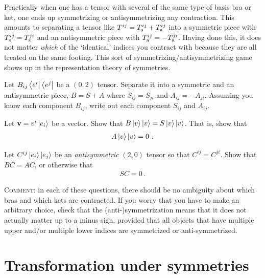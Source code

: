 \documentclass[12pt, oneside]{report}    %
\let\oldsection\section
\def\section{%
  \setcounter{sidenote}{1}%
  \oldsection
}
\begin{document}
Practically when one has a tensor with several of the same type of basis bra or ket, one ends up symmetrizing or antisymmetrizing any contraction. This amounts to separating a tensor like $T^{ij} = T^{ij}_\textnormal{s} + T^{ij}_\textnormal{a}$ into a symmetric piece with $T_\textnormal{s}^{ij} = T_\textnormal{s}^{ji}$ and an antisymmetric piece with $T_\textnormal{a}^{ij}=-T_\textnormal{a}^{ji}$. Having done this, it does not matter \emph{which} of the `identical' indices you contract with because they are all treated on the same footing. This sort of symmetrizing/antisymmetrizing game shows up in the representation theory of symmetries.

\begin{exercise}
Let $B_{ij}\left\langle e^i\right|\left\langle e^j\right|$ be a $(0,2)$ tensor. Separate it into a symmetric and an antisymmetric piece, $B = S+A$ where $S_{ij} = S_{ji}$ and $A_{ij} = - A_{ji}$. Assuming you know each component $B_{ij}$, write out each component $S_{ij}$ and $A_{ij}$.

Let $\mathbf{v} = v^i\left|e_i\right\rangle$ be a vector. Show that $B\left|v\right\rangle\left|v\right\rangle = S\left|v\right\rangle\left|v\right\rangle$. That is, show that
\begin{align}
    A\left|v\right\rangle\left|v\right\rangle = 0 \ .
\end{align}

Let $C^{ij}\left|e_i\right\rangle\left|e_j\right\rangle$ be an \emph{antisymmetric} $(2,0)$ tensor so that $C^{ij} = C^{ji}$. Show that $BC = AC$, or otherwise that
\begin{align}
    SC = 0 \ .
\end{align}

\textsc{Comment}: in each of these questions, there should be no ambiguity about which bras and which kets are contracted. If you worry that you have to make an arbitrary choice, check that the (anti-)symmetrization means that it does not actually matter up to a minus sign, provided that all objects that have multiple upper and/or multiple lower indices are symmetrized or anti-symmetrized.
\end{exercise}
 

\section{Transformation under symmetries}
\end{document}
